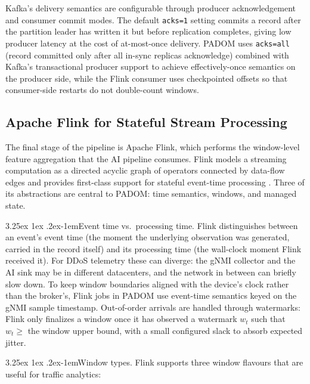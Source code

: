 \documentclass[12pt, a4paper, reqno, oneside]{book}
\makeatletter
\newcommand{\padonap}{\textsc{PADOM}}
\renewcommand\paragraph{\@startsection{paragraph}{5}{\z@}%
  {3.25ex \@plus1ex \@minus.2ex}{-1em}{\normalfont\normalsize\bfseries}}
\makeatother
\begin{document}
Kafka's delivery semantics are configurable through producer acknowledgement
and consumer commit modes. The default \texttt{acks=1} setting commits a
record after the partition leader has written it but before replication
completes, giving low producer latency at the cost of at-most-once delivery.
\padonap{} uses \texttt{acks=all} (record committed only after all in-sync
replicas acknowledge) combined with Kafka's transactional producer support
to achieve effectively-once semantics on the producer side, while the Flink
consumer uses checkpointed offsets so that consumer-side restarts do not
double-count windows.

\subsection{Apache Flink for Stateful Stream Processing}
\label{subsec:flink-bg}

The final stage of the pipeline is Apache Flink, which performs the
window-level feature aggregation that the AI pipeline consumes. Flink models
a streaming computation as a directed acyclic graph of operators connected by
data-flow edges and provides first-class support for stateful event-time
processing \cite{flink_carbone2015}. Three of its abstractions are central
to \padonap{}: time semantics, windows, and managed state.

\paragraph{Event time vs.\ processing time.}
Flink distinguishes between an event's event time (the moment the
underlying observation was generated, carried in the record itself) and its
processing time (the wall-clock moment Flink received it). For DDoS
telemetry these can diverge: the gNMI collector and the AI sink may be in
different datacenters, and the network in between can briefly slow down. To
keep window boundaries aligned with the device's clock rather than the
broker's, Flink jobs in \padonap{} use event-time semantics keyed on the
gNMI sample timestamp. Out-of-order arrivals are handled through
watermarks: Flink only finalizes a window once it has observed a
watermark $w_t$ such that $w_t \geq$ the window upper bound, with a small
configured slack to absorb expected jitter.

\paragraph{Window types.}
Flink supports three window flavours that are useful for traffic analytics:
\end{document}
